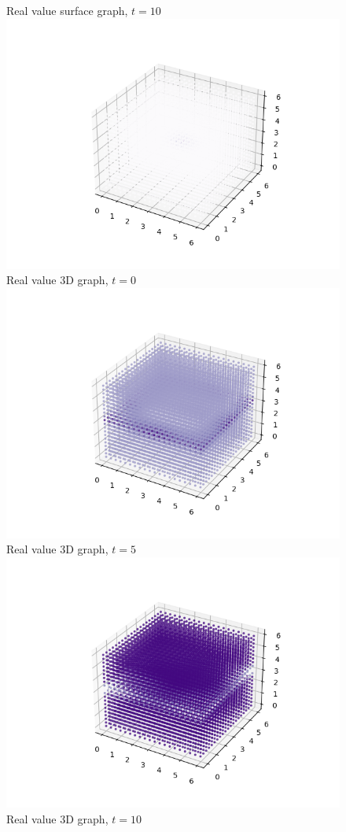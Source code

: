 \documentclass[a4paper,8pt]{article}
\begin{document}
\begin{figure}[h!]
\begin{multicols}{2}
Real value surface graph, $t=10$
\includegraphics[width=1\linewidth]{t0real3d}\\
Real value 3D graph, $t=0$
\includegraphics[width=1\linewidth]{t5real3d}\\
Real value 3D graph, $t=5$
\includegraphics[width=1\linewidth]{t10real3d}\\
Real value 3D graph, $t=10$
\end{multicols}
\end{figure}
\end{document}
